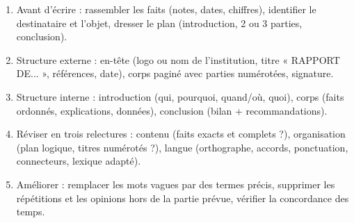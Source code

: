\documentclass[11pt]{article}
\newcommand{\cle}[1]{{\popxbold\color{popdark}#1}}
\begin{document}
\begin{methode}
\begin{enumerate}
\item \cle{Avant d'écrire} : rassembler les faits (notes, dates, chiffres), identifier le destinataire et l'objet, dresser le plan (introduction, 2 ou 3 parties, conclusion).
\item \cle{Structure externe} : en-tête (logo ou nom de l'institution, titre « RAPPORT DE... », références, date), corps paginé avec parties numérotées, signature.
\item \cle{Structure interne} : introduction (qui, pourquoi, quand/où, quoi), corps (faits ordonnés, explications, données), conclusion (bilan + recommandations).
\item \cle{Réviser} en trois relectures : contenu (faits exacts et complets ?), organisation (plan logique, titres numérotés ?), langue (orthographe, accords, ponctuation, connecteurs, lexique adapté).
\item \cle{Améliorer} : remplacer les mots vagues par des termes précis, supprimer les répétitions et les opinions hors de la partie prévue, vérifier la concordance des temps.
\end{enumerate}
\end{methode}
\end{document}
